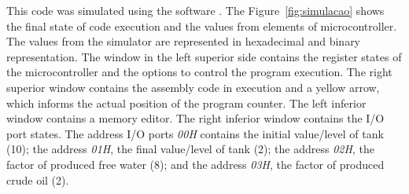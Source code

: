 This code was simulated using the software \cite{Simulator_z80}. The
Figure~\ref{fig:simulacao} shows the final state of code execution and the values
from elements of microcontroller. The values from the simulator are represented
in hexadecimal and binary representation. The window in the left superior side
contains the register states of the microcontroller and the options to control
the program execution. The right superior window contains the assembly code in
execution and a yellow arrow, which informs the actual position of the program
counter. The left inferior window contains a memory editor. The right inferior
window contains the I/O port states.
The address I/O ports \textit{00H} contains the initial value/level of tank (10);
the address \textit{01H}, the final value/level of tank (2); the address
\textit{02H}, the factor of produced free water (8); and the address
\textit{03H}, the factor of produced crude oil (2).





